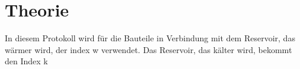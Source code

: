 \section{Theorie}
In diesem Protokoll wird für die Bauteile in Verbindung mit dem Reservoir, das wärmer wird,
der index w verwendet. 
Das Reservoir, das kälter wird, bekommt den Index k












